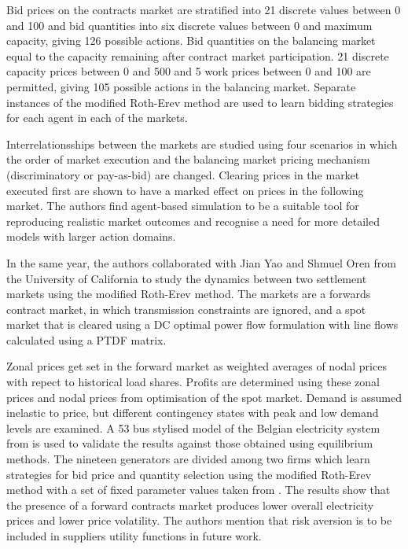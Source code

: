 Bid prices on the contracts market are stratified into 21 discrete
values between 0 and 100 and bid quantities into six discrete values between 0
and maximum capacity, giving 126 possible actions.  Bid quantities on the
balancing market equal to the capacity remaining after contract market
participation.  21 discrete capacity prices between 0 and 500 and 5 work prices
between 0 and 100 are permitted, giving 105 possible actions in the balancing
market.  Separate instances of the modified Roth-Erev method are used to learn
bidding strategies for each agent in each of the markets.

Interrelationsships between the markets are studied using four scenarios in
which the order of market execution and the balancing market pricing mechanism
(discriminatory or pay-as-bid) are changed.  Clearing prices in the market
executed first are shown to have a marked effect on prices in the
following market.  The authors find agent-based simulation to be a suitable
tool for reproducing realistic market outcomes and recognise a need for more
detailed models with larger action domains.

In the same year, the authors collaborated with Jian Yao and Shmuel Oren from
the University of California to study the dynamics between two settlement
markets using the modified Roth-Erev method.  The markets are a forwards
contract market, in which transmission constraints are ignored, and a spot
market that is cleared using a DC optimal power flow formulation with line
flows calculated using a PTDF matrix.

Zonal prices get set in the forward market as weighted averages of nodal prices
with repect to historical load shares.  Profits are determined using these
zonal prices and nodal prices from optimisation of the spot market.  Demand is assumed
inelastic to price, but different contingency states with peak and low demand
levels are examined.  A 53 bus stylised model of the Belgian electricity
system from \cite{yao:07,yao:08} is used to validate the results against those
obtained using equilibrium methods.  The nineteen generators are divided among
two firms which learn strategies for bid price and quantity selection using the
modified Roth-Erev method with a set of fixed parameter values taken from
\cite{roth:aer}.  The results show that the presence of a forward contracts
market produces lower overall electricity prices and lower price volatility.
The authors mention that risk aversion is to be included in suppliers utility
functions in future work.

